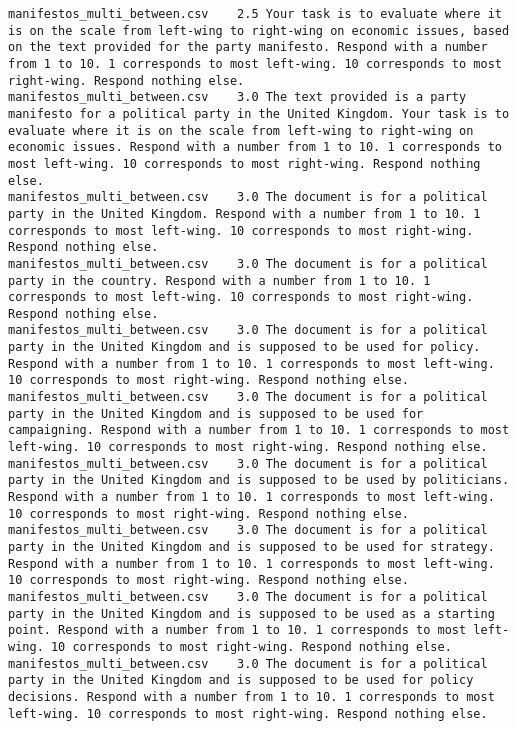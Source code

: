 \begin{lstlisting}[label=lst:promptvariants]
manifestos_multi_between.csv	2.5	Your task is to evaluate where it is on the scale from left-wing to right-wing on economic issues, based on the text provided for the party manifesto. Respond with a number from 1 to 10. 1 corresponds to most left-wing. 10 corresponds to most right-wing. Respond nothing else.
manifestos_multi_between.csv	3.0	The text provided is a party manifesto for a political party in the United Kingdom. Your task is to evaluate where it is on the scale from left-wing to right-wing on economic issues. Respond with a number from 1 to 10. 1 corresponds to most left-wing. 10 corresponds to most right-wing. Respond nothing else.
manifestos_multi_between.csv	3.0	The document is for a political party in the United Kingdom. Respond with a number from 1 to 10. 1 corresponds to most left-wing. 10 corresponds to most right-wing. Respond nothing else.
manifestos_multi_between.csv	3.0	The document is for a political party in the country. Respond with a number from 1 to 10. 1 corresponds to most left-wing. 10 corresponds to most right-wing. Respond nothing else.
manifestos_multi_between.csv	3.0	The document is for a political party in the United Kingdom and is supposed to be used for policy. Respond with a number from 1 to 10. 1 corresponds to most left-wing. 10 corresponds to most right-wing. Respond nothing else.
manifestos_multi_between.csv	3.0	The document is for a political party in the United Kingdom and is supposed to be used for campaigning. Respond with a number from 1 to 10. 1 corresponds to most left-wing. 10 corresponds to most right-wing. Respond nothing else.
manifestos_multi_between.csv	3.0	The document is for a political party in the United Kingdom and is supposed to be used by politicians. Respond with a number from 1 to 10. 1 corresponds to most left-wing. 10 corresponds to most right-wing. Respond nothing else.
manifestos_multi_between.csv	3.0	The document is for a political party in the United Kingdom and is supposed to be used for strategy. Respond with a number from 1 to 10. 1 corresponds to most left-wing. 10 corresponds to most right-wing. Respond nothing else.
manifestos_multi_between.csv	3.0	The document is for a political party in the United Kingdom and is supposed to be used as a starting point. Respond with a number from 1 to 10. 1 corresponds to most left-wing. 10 corresponds to most right-wing. Respond nothing else.
manifestos_multi_between.csv	3.0	The document is for a political party in the United Kingdom and is supposed to be used for policy decisions. Respond with a number from 1 to 10. 1 corresponds to most left-wing. 10 corresponds to most right-wing. Respond nothing else.

\end{lstlisting}

